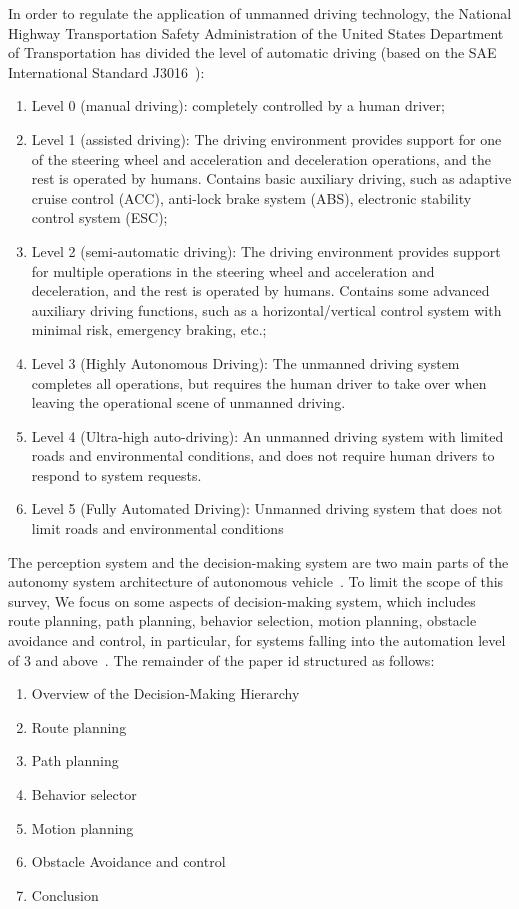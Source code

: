 \documentclass[conference]{IEEEtran}
\begin{document}
In order to regulate the application of unmanned driving technology, the National Highway Transportation Safety Administration of the United States Department of Transportation has divided the level of automatic driving (based on the SAE International Standard J3016~\cite{sae2018taxonomy}):
\begin{enumerate}
	\item Level 0 (manual driving): completely controlled by a human driver;
	\item Level 1 (assisted driving): The driving environment provides support for one of the steering wheel and acceleration and deceleration operations, and the rest is operated by humans. Contains basic auxiliary driving, such as adaptive cruise control (ACC), anti-lock brake system (ABS), electronic stability control system (ESC);
	\item Level 2 (semi-automatic driving): The driving environment provides support for multiple operations in the steering wheel and acceleration and deceleration, and the rest is operated by humans.  Contains some advanced auxiliary driving functions, such as a horizontal/vertical control system with minimal risk, emergency braking, etc.;
	\item Level 3 (Highly Autonomous Driving): The unmanned driving system completes all operations, but requires the human driver to take over when leaving the operational scene of unmanned driving.
	\item Level 4 (Ultra-high auto-driving): An unmanned driving system with limited roads and environmental conditions, and does not require human drivers to respond to system requests.
	\item Level 5 (Fully Automated Driving): Unmanned driving system that does not limit roads and environmental conditions
\end{enumerate}

The perception system and the decision-making system are two main parts of the autonomy system architecture of autonomous vehicle~\cite{Brian2016}. To limit the scope of this survey, We focus on some aspects of decision-making system, which includes route planning, path planning, behavior selection, motion planning, obstacle avoidance and control, in particular, for systems falling into the automation level of 3 and above~\cite{self_driving}.
The remainder of the paper id structured as follows:
\begin{enumerate}
	\item Overview of the Decision-Making Hierarchy
	\item Route planning
	\item Path planning
	\item Behavior selector
	\item Motion planning
	\item Obstacle Avoidance and control
	\item Conclusion
\end{enumerate}
\end{document}
